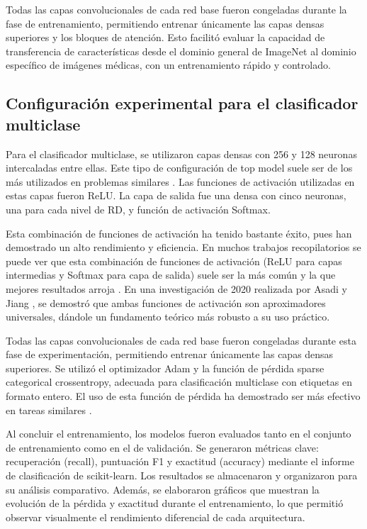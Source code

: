 Todas las capas convolucionales de cada red base fueron congeladas durante la fase de 
entrenamiento, permitiendo entrenar únicamente las capas densas superiores y los bloques 
de atención. Esto facilitó evaluar la capacidad de transferencia de características desde 
el dominio general de ImageNet al dominio específico de imágenes médicas, con un 
entrenamiento rápido y controlado.

\subsection{Configuración experimental para el clasificador multiclase}

Para el clasificador multiclase, se utilizaron capas densas con 256 y 128 neuronas 
intercaladas entre ellas. Este tipo de configuración de top model suele ser de los más 
utilizados en problemas similares . Las funciones de 
activación utilizadas en estas capas fueron ReLU. La capa de salida fue una densa con 
cinco neuronas, una para cada nivel de RD, y función de activación Softmax.

Esta combinación de funciones de activación ha tenido bastante éxito, pues han demostrado 
un alto rendimiento y eficiencia. En muchos trabajos recopilatorios se puede ver que esta 
combinación de funciones de activación (ReLU para capas intermedias y Softmax para capa 
de salida) suele ser la más común y la que mejores resultados arroja 
. En una investigación de 2020 realizada por Asadi y Jiang 
, se demostró que ambas funciones de activación son 
aproximadores universales, dándole un fundamento teórico más robusto a su uso práctico.

Todas las capas convolucionales de cada red base fueron congeladas durante esta fase de 
experimentación, permitiendo entrenar únicamente las capas densas superiores. Se utilizó 
el optimizador Adam y la función de pérdida sparse categorical crossentropy, adecuada 
para clasificación multiclase con etiquetas en formato entero. El uso de esta función de 
pérdida ha demostrado ser más efectivo en tareas similares 
.

Al concluir el entrenamiento, los modelos fueron evaluados tanto en el conjunto de 
entrenamiento como en el de validación. Se generaron métricas clave: recuperación 
(recall), puntuación F1 y exactitud (accuracy) mediante el informe de clasificación de 
scikit-learn. Los resultados se almacenaron y organizaron para su análisis comparativo. 
Además, se elaboraron gráficos que muestran la evolución de la pérdida y exactitud 
durante el entrenamiento, lo que permitió observar visualmente el rendimiento diferencial 
de cada arquitectura.

